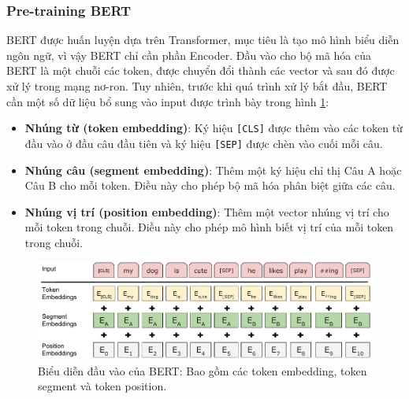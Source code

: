 \subsubsection{Pre-training BERT}

BERT được huấn luyện dựa trên Transformer, mục tiêu là tạo mô hình biểu diễn ngôn ngữ, vì vậy BERT chỉ cần phần Encoder. Đầu vào cho bộ mã hóa của BERT là một chuỗi các token, được chuyển đổi thành các vector và sau đó được xử lý trong mạng nơ-ron. Tuy nhiên, trước khi quá trình xử lý bắt đầu, BERT cần một số dữ liệu bổ sung vào input được trình bày trong hình \ref{figure:Input_Emebeddings}:

\begin{itemize}
    \item \textbf{Nhúng từ (token embedding)}: Ký hiệu {\tt [CLS]} được thêm vào các token từ đầu vào ở đầu câu đầu tiên và ký hiệu {\tt [SEP]} được chèn vào cuối mỗi câu.
    \item \textbf{Nhúng câu (segment embedding)}: Thêm một ký hiệu chỉ thị Câu A hoặc Câu B cho mỗi token. Điều này cho phép bộ mã hóa phân biệt giữa các câu.
    \item \textbf{Nhúng vị trí (position embedding)}: Thêm một vector nhúng vị trí cho mỗi token trong chuỗi. Điều này cho phép mô hình biết vị trí của mỗi token trong chuỗi.
\end{itemize}

\begin{figure}[htb]
    \centering
    \includegraphics[width=\textwidth]{image/Input_Emebeddings.pdf}
    \caption{Biểu diễn đầu vào của BERT: Bao gồm các token embedding, token segment và token position.}
    \label{figure:Input_Emebeddings}
\end{figure}

